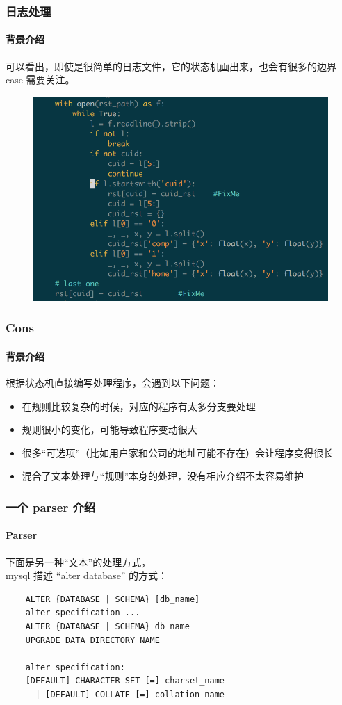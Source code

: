 \begin{frame}[fragile]
  \frametitle{日志处理}
  \framesubtitle{背景介绍}
  可以看出，即使是很简单的日志文件，它的状态机画出来，也会有很多的边界 case 需要关注。
  \begin{figure}[htbp]
    \centering
    \includegraphics[scale=.3]{imgs/py-regular.png}
  \end{figure}
\end{frame}

\begin{frame}[fragile]
  \frametitle{Cons}
  \framesubtitle{背景介绍}
  根据状态机直接编写处理程序，会遇到以下问题：
  
  \begin{itemize}
  \item 在规则比较复杂的时候，对应的程序有太多分支要处理
  \item 规则很小的变化，可能导致程序变动很大
  \item 很多“可选项”（比如用户家和公司的地址可能不存在）会让程序变得很长
  \item 混合了文本处理与“规则”本身的处理，没有相应介绍不太容易维护
  \end{itemize}
\end{frame}

\begin{frame}[fragile]
  \frametitle{一个 parser 介绍}
  \framesubtitle{Parser}
  下面是另一种“文本”的处理方式，\\ mysql 描述 ``alter database'' 的方式：
  
  \begin{verbatim}
    ALTER {DATABASE | SCHEMA} [db_name]
    alter_specification ...
    ALTER {DATABASE | SCHEMA} db_name
    UPGRADE DATA DIRECTORY NAME

    alter_specification:
    [DEFAULT] CHARACTER SET [=] charset_name
      | [DEFAULT] COLLATE [=] collation_name
  \end{verbatim}
\end{frame}

